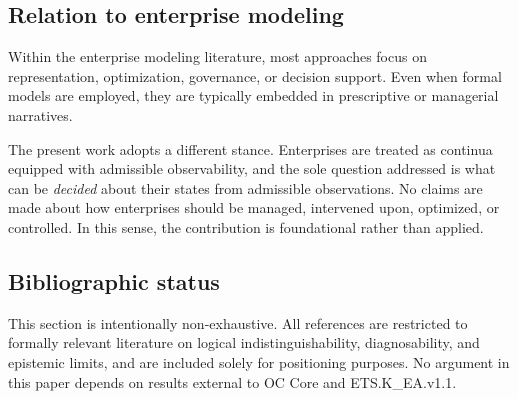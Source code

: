 \subsection{Relation to enterprise modeling}

Within the enterprise modeling literature, most approaches focus on
representation, optimization, governance, or decision support. Even
when formal models are employed, they are typically embedded in
prescriptive or managerial narratives.

The present work adopts a different stance. Enterprises are treated as
continua equipped with admissible observability, and the sole question
addressed is what can be \emph{decided} about their states from
admissible observations. No claims are made about how enterprises
should be managed, intervened upon, optimized, or controlled. In this
sense, the contribution is foundational rather than applied.

\subsection{Bibliographic status}

This section is intentionally non-exhaustive. All references are
restricted to formally relevant literature on logical
indistinguishability, diagnosability, and epistemic limits, and are
included solely for positioning purposes. No argument in this paper
depends on results external to OC Core and ETS.K\_EA.v1.1.
